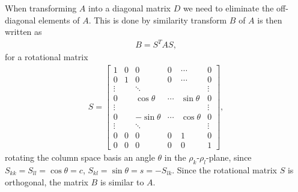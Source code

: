 \documentclass[twocolumn]{aastex62}
\begin{document}
When transforming $A$ into a diagonal matrix $D$ we need to eliminate the off-diagonal elements of $A$. This is done by similarity transform $B$ of $A$ is then written as  
\begin{align}
	B = S^T A S,
\end{align}
for a rotational matrix 
\begin{align}
S = 
	\begin{bmatrix}
		1 & 0 & 0 & 0 & \cdots & 0\\
		0 & 1 & 0 & 0 & \cdots & 0 \\	
		\vdots & & \ddots & & & \vdots \\
		0 & & \cos\theta & \cdots & \sin\theta & 0\\
		\vdots & & & & & \vdots \\
		0 & & -\sin\theta & \cdots & \cos\theta & 0\\
		\vdots & & \ddots & & & \vdots \\
		0 & 0 & 0 & 0 & 1 & 0\\		
		0 & 0 & 0 & 0 & 0 & 1
	\end{bmatrix},
\end{align}
rotating the column space basis an angle $\theta$ in the $\rho_k$-$\rho_l$-plane, since $S_{kk} = S_{ll} = \cos\theta = c$, $S_{kl} = \sin\theta = s = -S_{lk}$. Since the rotational matrix $S$ is orthogonal, the matrix $B$ is similar to $A$.
\end{document}
